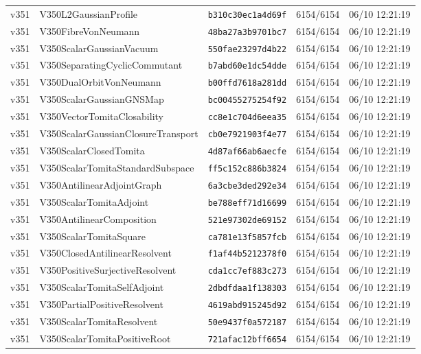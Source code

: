 \documentclass[11pt]{article}
\theoremstyle{definition}\newtheorem{deriv}{Derivation}
\begin{document}
{\begin{longtable}{@{}lllll@{}}
v351 & V350L2GaussianProfile & \texttt{b310c30ec1a4d69f} & 6154/6154 & 06/10 12:21:19 \\
v351 & V350FibreVonNeumann & \texttt{48ba27a3b9701bc7} & 6154/6154 & 06/10 12:21:19 \\
v351 & V350ScalarGaussianVacuum & \texttt{550fae23297d4b22} & 6154/6154 & 06/10 12:21:19 \\
v351 & V350SeparatingCyclicCommutant & \texttt{b7abd60e1dc54dde} & 6154/6154 & 06/10 12:21:19 \\
v351 & V350DualOrbitVonNeumann & \texttt{b00ffd7618a281dd} & 6154/6154 & 06/10 12:21:19 \\
v351 & V350ScalarGaussianGNSMap & \texttt{bc00455275254f92} & 6154/6154 & 06/10 12:21:19 \\
v351 & V350VectorTomitaClosability & \texttt{cc8e1c704d6eea35} & 6154/6154 & 06/10 12:21:19 \\
v351 & V350ScalarGaussianClosureTransport & \texttt{cb0e7921903f4e77} & 6154/6154 & 06/10 12:21:19 \\
v351 & V350ScalarClosedTomita & \texttt{4d87af66ab6aecfe} & 6154/6154 & 06/10 12:21:19 \\
v351 & V350ScalarTomitaStandardSubspace & \texttt{ff5c152c886b3824} & 6154/6154 & 06/10 12:21:19 \\
v351 & V350AntilinearAdjointGraph & \texttt{6a3cbe3ded292e34} & 6154/6154 & 06/10 12:21:19 \\
v351 & V350ScalarTomitaAdjoint & \texttt{be788eff71d16699} & 6154/6154 & 06/10 12:21:19 \\
v351 & V350AntilinearComposition & \texttt{521e97302de69152} & 6154/6154 & 06/10 12:21:19 \\
v351 & V350ScalarTomitaSquare & \texttt{ca781e13f5857fcb} & 6154/6154 & 06/10 12:21:19 \\
v351 & V350ClosedAntilinearResolvent & \texttt{f1af44b5212378f0} & 6154/6154 & 06/10 12:21:19 \\
v351 & V350PositiveSurjectiveResolvent & \texttt{cda1cc7ef883c273} & 6154/6154 & 06/10 12:21:19 \\
v351 & V350ScalarTomitaSelfAdjoint & \texttt{2dbdfdaa1f138303} & 6154/6154 & 06/10 12:21:19 \\
v351 & V350PartialPositiveResolvent & \texttt{4619abd915245d92} & 6154/6154 & 06/10 12:21:19 \\
v351 & V350ScalarTomitaResolvent & \texttt{50e9437f0a572187} & 6154/6154 & 06/10 12:21:19 \\
v351 & V350ScalarTomitaPositiveRoot & \texttt{721afac12bff6654} & 6154/6154 & 06/10 12:21:19 \\

\end{longtable}}
\end{document}
